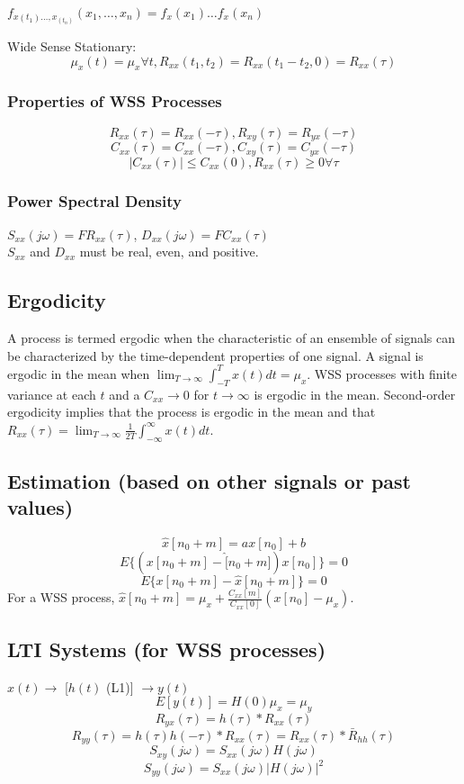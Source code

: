 \documentclass[8pt]{extarticle}
\begin{document}
\begin{multicols*}{3}
\begin{center}
\( f_{x(t_1)\ldots,x_(t_n)}(x_1,\ldots,x_n) = f_x(x_1)\ldots f_x(x_n) \)

Wide Sense Stationary:
\[ \mu_x(t) = \mu_x \forall t, R_{xx}(t_1, t_2) = R_{xx}(t_1-t_2, 0) = R_{xx}(\tau) \]

\subsubsection{Properties of WSS Processes}
\[ R_{xx}(\tau) = R_{xx}(-\tau), R_{xy}(\tau) = R_{yx}(-\tau) \]
\[ C_{xx}(\tau) = C_{xx}(-\tau), C_{xy}(\tau) = C_{yx}(-\tau) \]
\[ |C_{xx}(\tau)| \leq C_{xx}(0), R_{xx}(\tau) \geq 0 \forall \tau \]

\subsubsection{Power Spectral Density}
\( S_{xx}(j\omega) = F{R_{xx}(\tau)} \), \( D_{xx}(j\omega) = F{C_{xx}(\tau)} \) \\
\( S_{xx} \) and \( D_{xx} \) must be real, even, and positive.

\subsection{Ergodicity}
A process is termed ergodic when the characteristic of an ensemble of signals can be characterized by the time-dependent properties of one signal. A signal is ergodic in the mean when \( \lim_{T \rightarrow \infty} \int_{-T}^{T} x(t) dt = \mu_x \). WSS processes with finite variance at each \( t \) and a \( C_{xx} \rightarrow 0 \) for \( t \rightarrow \infty \) is ergodic in the mean. Second-order ergodicity implies that the process is ergodic in the mean and that \( R_{xx}(\tau) = \lim_{T \rightarrow \infty} \frac{1}{2T} \int_{-\infty}^{\infty} x(t) dt \).

\subsection{Estimation (based on other signals or past values)}
\[ \hat{x}[n_0+m] = ax[n_0] + b \]
\[ E\{(x[n_0+m]-\hat[n_0+m])x[n_0]\} = 0 \]
\[ E\{x[n_0+m]-\hat{x}[n_0+m]\} = 0 \]
For a WSS process, \( \hat{x}[n_0+m] = \mu_x + \frac{C_{xx}[m]}{C_{xx}[0]}(x[n_0]-\mu_x) \).

\subsection{LTI Systems (for WSS processes)}
\( x(t) \rightarrow \) [\( h(t) \) (L1)] \( \rightarrow y(t) \) \\
\[ E[y(t)] = H(0)\mu_x = \mu_y \]
\[ R_{yx}(\tau) = h(\tau) * R_{xx}(\tau) \]
\[ R_{yy}(\tau) = h(\tau) h(-\tau) * R_{xx}(\tau) = R_{xx}(\tau) * \bar{R}_{hh}(\tau) \]
\[ S_{xy}(j\omega) = S_{xx}(j\omega)H(j\omega) \]
\[ S_{yy}(j\omega) = S_{xx}(j\omega)|H(j\omega)|^2 \]


\end{center}
\end{multicols*}
\end{document}
